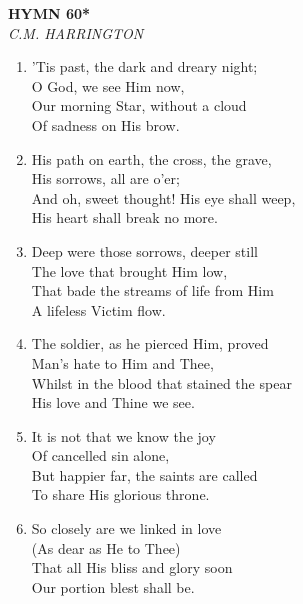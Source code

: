 \documentclass[11pt,a4paper]{article}
\begin{document}
\newpage
\begin{center}
    {\Large \textbf{HYMN 60*}}
    \\
    \textit{C.M. HARRINGTON}
\end{center}
\vspace{1em}

\begin{enumerate}
    \item 'Tis past, the dark and dreary night; \\
        O God, we see Him now, \\
        Our morning Star, without a cloud \\
        Of sadness on His brow.

    \item His path on earth, the cross, the grave, \\
        His sorrows, all are o'er; \\
        And oh, sweet thought! His eye shall weep, \\
        His heart shall break no more.

    \item Deep were those sorrows, deeper still \\
        The love that brought Him low, \\
        That bade the streams of life from Him \\
        A lifeless Victim flow.

    \item The soldier, as he pierced Him, proved \\
        Man's hate to Him and Thee, \\
        Whilst in the blood that stained the spear \\
        His love and Thine we see.

    \item It is not that we know the joy \\
        Of cancelled sin alone, \\
        But happier far, the saints are called \\
        To share His glorious throne.

    \item So closely are we linked in love \\
        (As dear as He to Thee) \\
        That all His bliss and glory soon \\
        Our portion blest shall be.

\end{enumerate}
\end{document}
